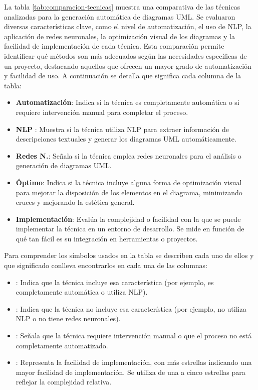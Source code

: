 La tabla \ref{tab:comparacion-tecnicas} muestra una comparativa de las técnicas analizadas para la generación automática de diagramas UML. Se evaluaron diversas características clave, como el nivel de automatización, el uso de NLP, la aplicación de redes neuronales, la optimización visual de los diagramas y la facilidad de implementación de cada técnica. Esta comparación permite identificar qué métodos son más adecuados según las necesidades específicas de un proyecto, destacando aquellos que ofrecen un mayor grado de automatización y facilidad de uso. A continuación se detalla que significa cada columna de la tabla:

\begin{itemize}
	\item \textbf{Automatización}: Indica si la técnica es completamente automática o si requiere intervención manual para completar el proceso.
	
	\item \textbf{NLP }: Muestra si la técnica utiliza NLP para extraer información de descripciones textuales y generar los diagramas UML automáticamente.
	
	\item \textbf{Redes N.}: Señala si la técnica emplea redes neuronales para el análisis o generación de diagramas UML.
	
	\item \textbf{Óptimo}: Indica si la técnica incluye alguna forma de optimización visual para mejorar la disposición de los elementos en el diagrama, minimizando cruces y mejorando la estética general.
	
	\item \textbf{Implementación}: Evalúa la complejidad o facilidad con la que se puede implementar la técnica en un entorno de desarrollo. Se mide en función de qué tan fácil es su integración en herramientas o proyectos.
\end{itemize}

Para comprender los símbolos usados en la tabla se describen cada uno de ellos y que significado conlleva encontrarlos en cada una de las columnas:

\begin{itemize}
	\item \textbf{}: Indica que la técnica incluye esa característica (por ejemplo, es completamente automática o utiliza NLP).
	
	\item \textbf{}: Indica que la técnica no incluye esa característica (por ejemplo, no utiliza NLP o no tiene redes neuronales).
	
	\item \textbf{\faMinus}: Señala que la técnica requiere intervención manual o que el proceso no está completamente automatizado.
	
	\item \textbf{\starL}: Representa la facilidad de implementación, con más estrellas indicando una mayor facilidad de implementación. Se utiliza de una a cinco estrellas para reflejar la complejidad relativa.
\end{itemize}

